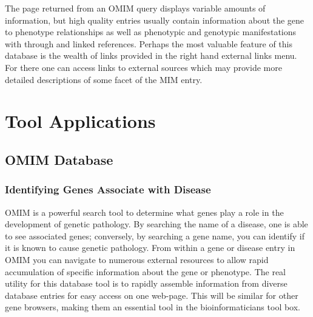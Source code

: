 The page returned from an OMIM query displays variable amounts of information, but high quality entries usually contain information about the gene to phenotype relationships as well as phenotypic and genotypic manifestations with through and linked references. Perhaps the most valuable feature of this database is the wealth of links provided in the right hand external links menu. For there one can access links to external sources which may provide more detailed descriptions of some facet of the MIM entry.\autocite{B5}

\section{Tool Applications}

    \subsection{OMIM Database}
        \subsubsection{Identifying Genes Associate with Disease}
        OMIM is a powerful search tool to determine what genes play a role in the development of genetic pathology. By searching the name of a disease, one is able to see associated genes; conversely, by searching a gene name, you can identify if it is known to cause genetic pathology.\autocite{L3} From within a gene or disease entry in OMIM you can navigate to numerous external resources to allow rapid accumulation of specific information about the gene or phenotype.\autocite{B5} The real utility for this database tool is to rapidly assemble information from diverse database entries for easy access on one web-page. This will be similar for other gene browsers, making them an essential tool in the bioinformaticians tool box.
